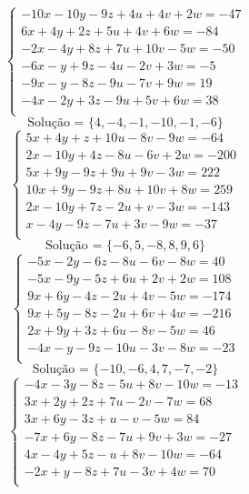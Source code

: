 \documentclass[12pt,oneside,a4paper]{article}
\begin{document}
\vspace{\baselineskip}
\begin{equation*}
\begin{cases}
-10x-10y-9z+4u+4v+2w=-47 \\
6x+4y+2z+5u+4v+6w=-84 \\
-2x-4y+8z+7u+10v-5w=-50 \\
-6x-y+9z-4u-2v+3w=-5 \\
-9x-y-8z-9u-7v+9w=19 \\
-4x-2y+3z-9u+5v+6w=38 \\
\end{cases}
\end{equation*}
\begin{equation*}
\text{Solução = }\{4,-4,-1,-10,-1,-6\}
\end{equation*}
\vspace{\baselineskip}
\begin{equation*}
\begin{cases}
5x+4y+z+10u-8v-9w=-64 \\
2x-10y+4z-8u-6v+2w=-200 \\
5x+9y-9z+9u+9v-3w=222 \\
10x+9y-9z+8u+10v+8w=259 \\
2x-10y+7z-2u+v-3w=-143 \\
x-4y-9z-7u+3v-9w=-37 \\
\end{cases}
\end{equation*}
\begin{equation*}
\text{Solução = }\{-6,5,-8,8,9,6\}
\end{equation*}
\vspace{\baselineskip}
\begin{equation*}
\begin{cases}
-5x-2y-6z-8u-6v-8w=40 \\
-5x-9y-5z+6u+2v+2w=108 \\
9x+6y-4z-2u+4v-5w=-174 \\
9x+5y-8z-2u+6v+4w=-216 \\
2x+9y+3z+6u-8v-5w=46 \\
-4x-y-9z-10u-3v-8w=-23 \\
\end{cases}
\end{equation*}
\begin{equation*}
\text{Solução = }\{-10,-6,4,7,-7,-2\}
\end{equation*}
\vspace{\baselineskip}
\begin{equation*}
\begin{cases}
-4x-3y-8z-5u+8v-10w=-13 \\
3x+2y+2z+7u-2v-7w=68 \\
3x+6y-3z+u-v-5w=84 \\
-7x+6y-8z-7u+9v+3w=-27 \\
4x-4y+5z-u+8v-10w=-64 \\
-2x+y-8z+7u-3v+4w=70 \\
\end{cases}
\end{equation*}
\end{document}
